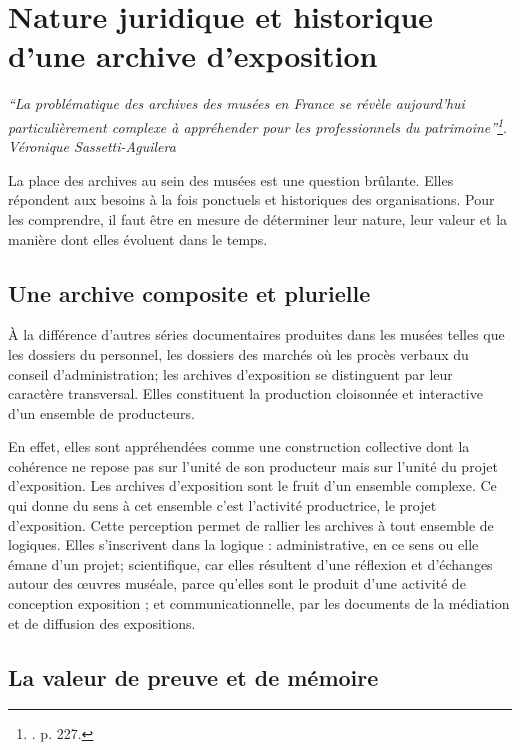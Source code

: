 \section{Nature juridique et historique d’une archive d'exposition}

 \textit{\enquote{La problématique des archives des musées en France se révèle aujourd’hui particulièrement complexe à appréhender pour les professionnels du patrimoine}\footnote{\cite{sasseti-aguilera-2020}. p. 227.}}.
 \textit{Véronique Sassetti-Aguilera}
 
 
La place des archives au sein des musées est une question brûlante. Elles répondent aux besoins à la fois ponctuels et historiques des organisations. Pour les comprendre, il faut être en mesure de déterminer leur nature, leur valeur et la manière dont elles évoluent dans le temps.


\subsection*{Une archive composite et plurielle}

À la différence d'autres séries documentaires produites dans les musées telles que les dossiers du personnel, les dossiers des marchés où les procès verbaux du conseil d’administration; les archives d'exposition se distinguent par leur caractère transversal. Elles constituent la production cloisonnée et interactive d'un ensemble de producteurs. 

En effet, elles sont appréhendées comme une construction collective dont la cohérence ne repose pas sur l'unité de son producteur mais sur l'unité du projet d'exposition. Les archives d'exposition sont le fruit d'un ensemble complexe. Ce qui donne du sens à cet ensemble c'est l'activité productrice, le projet d'exposition. Cette perception permet de rallier les archives à tout ensemble de logiques. Elles s'inscrivent dans la logique :  administrative, en ce sens ou elle émane d'un projet; scientifique, car elles résultent d'une réflexion et d'échanges autour des œuvres muséale,  parce qu'elles sont le produit d'une activité de conception exposition ;  et communicationnelle, par les documents de la médiation et de diffusion des expositions.

\subsection*{La valeur de preuve et de mémoire}

